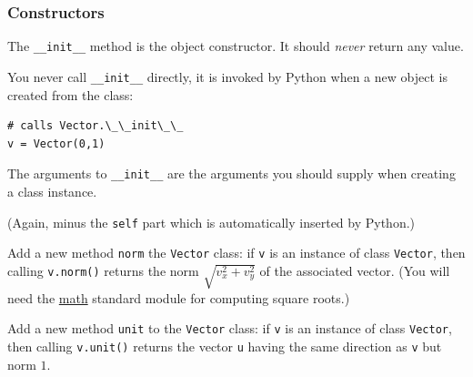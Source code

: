 \documentclass[english,serif,mathserif,xcolor=pdftex,dvipsnames,table]{beamer}
\begin{document}
\begin{frame}[fragile]
  \frametitle{Constructors}

  The \lstinline|__init__| method is the object constructor.
  It should \emph{never} return any value.

  \+
  You never call \lstinline|__init__| directly, it is invoked by
  Python when a new object is created from the class:
\begin{lstlisting}
# calls Vector.\_\_init\_\_
v = Vector(0,1)
\end{lstlisting}

  \+
  The arguments to \lstinline|__init__| are the arguments you
  should supply when creating a class instance.

  \+
  (Again, minus the \texttt{self} part which is automatically
  inserted by Python.)
\end{frame}








\begin{frame}[fragile]
  \begin{exercise}
    Add a new method \texttt{norm} the \texttt{Vector} class: if
    \texttt{v} is an instance of class \texttt{Vector}, then calling
    \texttt{v.norm()} returns the norm $\sqrt{v_x^2 + v_y^2}$ of
    the associated vector.
    (You will need the
    \href{http://docs.python.org/2/library/math.html}{math} standard
    module for computing square roots.)
  \end{exercise}

  \+
  \begin{exercise}
    Add a new method \texttt{unit} to the \texttt{Vector} class: if
    \texttt{v} is an instance of class \texttt{Vector}, then calling
    \texttt{v.unit()} returns the vector \texttt{u} having the
    same direction as \texttt{v} but norm $1$.
  \end{exercise}
\end{frame}


\end{document}
